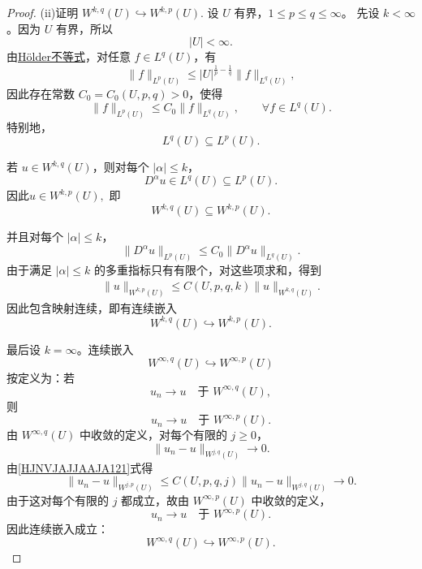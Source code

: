 \documentclass[../../main.tex]{subfiles}
\begin{document}
\begin{proof}
{\heiti (ii)证明 \(W^{k,q}(U)\hookrightarrow W^{k,p}(U)\).}
设 \(U\) 有界，\(1\leqslant p\leqslant q\leqslant\infty\)。
先设 \(k<\infty\)。因为 \(U\) 有界，所以
\[
|U|<\infty.
\]
由\hyperref[Real Analysis-theorem:实变函数--Hölder不等式]{Hölder不等式}，对任意 \(f\in L^q(U)\)，有
\[
\|f\|_{L^p(U)}
\leqslant
|U|^{\frac1p-\frac1q}
\|f\|_{L^q(U)},
\]
因此存在常数 \(C_0=C_0(U,p,q)>0\)，使得
\[
\|f\|_{L^p(U)}
\leqslant
C_0\|f\|_{L^q(U)},
\qquad
\forall f\in L^q(U).
\]
特别地，
\[
L^q(U)\subseteq L^p(U).
\]

若 \(u\in W^{k,q}(U)\)，则对每个 \(|\alpha|\leqslant k\)，
\[
D^\alpha u\in L^q(U)\subseteq L^p(U).
\]
因此$u\in W^{k,p}(U),$
即
\[
W^{k,q}(U)\subseteq W^{k,p}(U).
\]

并且对每个 \(|\alpha|\leqslant k\)，
\[
\|D^\alpha u\|_{L^p(U)}
\leqslant
C_0\|D^\alpha u\|_{L^q(U)}.
\]
由于满足 \(|\alpha|\leqslant k\) 的多重指标只有有限个，对这些项求和，得到
\begin{align}
\|u\|_{W^{k,p}(U)}
\leqslant
C(U,p,q,k)
\|u\|_{W^{k,q}(U)}.\label{HJNVJAJJAAJA121}
\end{align}
因此包含映射连续，即有连续嵌入
\[
W^{k,q}(U)\hookrightarrow W^{k,p}(U).
\]

最后设 \(k=\infty\)。连续嵌入
\[
W^{\infty,q}(U)\hookrightarrow W^{\infty,p}(U)
\]
按定义为：若
\[
u_n\to u\quad\text{于 }W^{\infty,q}(U),
\]
则
\[
u_n\to u\quad\text{于 }W^{\infty,p}(U).
\]
由 \(W^{\infty,q}(U)\) 中收敛的定义，对每个有限的 \(j\geqslant0\)，
\[
\|u_n-u\|_{W^{j,q}(U)}\to0.
\]
由\eqref{HJNVJAJJAAJA121}式得
\[
\|u_n-u\|_{W^{j,p}(U)}
\leqslant
C(U,p,q,j)
\|u_n-u\|_{W^{j,q}(U)}
\to0.
\]
由于这对每个有限的 \(j\) 都成立，故由 \(W^{\infty,p}(U)\) 中收敛的定义，
\[
u_n\to u\quad\text{于 }W^{\infty,p}(U).
\]
因此连续嵌入成立：
\[
W^{\infty,q}(U)\hookrightarrow W^{\infty,p}(U).
\]
\end{proof}
\end{document}
